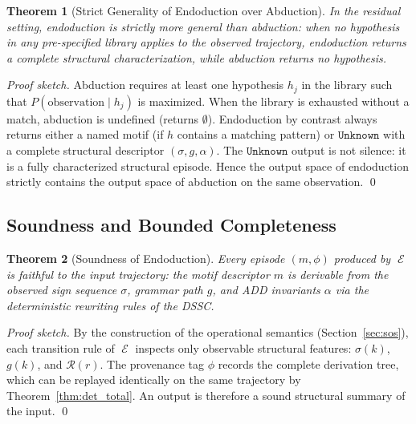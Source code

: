 \documentclass[11pt,a4paper]{article}
\theoremstyle{plain}
\newtheorem{theorem}{Theorem}[section]
\theoremstyle{definition}
\theoremstyle{remark}
\DeclareMathOperator{\Endo}{\mathcal{E}}
\begin{document}
\begin{theorem}[Strict Generality of Endoduction over Abduction]
\label{thm:endo_general}
  In the residual setting, endoduction is strictly more general than abduction: when no
  hypothesis in any pre-specified library applies to the observed trajectory, endoduction
  returns a complete structural characterization, while abduction returns no hypothesis.
\end{theorem}
\begin{proof}[Proof sketch]
  Abduction requires at least one hypothesis $h_j$ in the library such that
  $P(\text{observation} \mid h_j)$ is maximized. When the library is exhausted without a
  match, abduction is undefined (returns $\emptyset$). Endoduction by contrast always returns
  either a named motif (if $h$ contains a matching pattern) or $\mathtt{Unknown}$ with a
  complete structural descriptor $(\sigma, g, \alpha)$. The $\mathtt{Unknown}$ output is not
  silence: it is a fully characterized structural episode. Hence the output space of endoduction
  strictly contains the output space of abduction on the same observation. \qed
\end{proof}

\subsection{Soundness and Bounded Completeness}

\begin{theorem}[Soundness of Endoduction]
\label{thm:soundness}
  Every episode $(m, \phi)$ produced by $\Endo$ is faithful to the input trajectory: the motif
  descriptor $m$ is derivable from the observed sign sequence $\sigma$, grammar path $g$, and
  ADD invariants $\alpha$ via the deterministic rewriting rules of the DSSC.
\end{theorem}
\begin{proof}[Proof sketch]
  By the construction of the operational semantics (Section~\ref{sec:sos}), each transition rule
  of $\Endo$ inspects only observable structural features: $\sigma(k)$, $g(k)$, and
  $\mathcal{R}(r)$. The provenance tag $\phi$ records the complete derivation tree, which can
  be replayed identically on the same trajectory by Theorem~\ref{thm:det_total}. An output is
  therefore a sound structural summary of the input. \qed
\end{proof}
\end{document}
